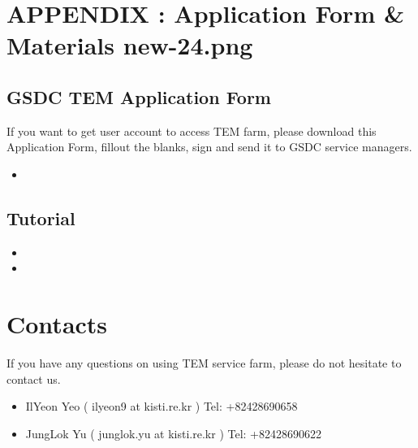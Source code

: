 \documentclass[a4paper,10pt,english]{sphinxmanual}
\begin{document}
\sphinxstepscope


\chapter[APPENDIX : Application Form \& Materials]{APPENDIX : Application Form \& Materials \lowercase{\sphinxincludegraphics}{{new-24}.png}}
\label{\detokenize{app:appendix-application-form-materials-newi}}\label{\detokenize{app::doc}}

\section{GSDC TEM Application Form}
\label{\detokenize{app:gsdc-tem-application-form}}
\sphinxAtStartPar
If you want to get user account to access TEM farm, please download this Application Form, fill\sphinxhyphen{}out the blanks, sign and send it to GSDC service managers.
\begin{itemize}
\item {} 
\sphinxAtStartPar
{}

\end{itemize}


\section{Tutorial}
\label{\detokenize{app:tutorial}}\begin{itemize}
\item {} 
\sphinxAtStartPar
{}

\item {} 
\sphinxAtStartPar
{}

\end{itemize}

\sphinxstepscope


\chapter{Contacts}
\label{\detokenize{contact:contacts}}\label{\detokenize{contact::doc}}
\sphinxAtStartPar
If you have any questions on using TEM service farm, please do not hesitate to contact us.
\begin{itemize}
\item {} 
\sphinxAtStartPar
Il\sphinxhyphen{}Yeon Yeo ( ilyeon9 at kisti.re.kr ) Tel: +82\sphinxhyphen{}42\sphinxhyphen{}869\sphinxhyphen{}0658

\item {} 
\sphinxAtStartPar
Jung\sphinxhyphen{}Lok Yu ( junglok.yu at kisti.re.kr ) Tel: +82\sphinxhyphen{}42\sphinxhyphen{}869\sphinxhyphen{}0622

\end{itemize}
\end{document}
